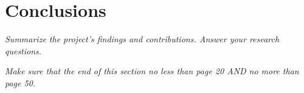 \section{Conclusions}

\textit{Summarize the project's findings and contributions. Answer your research questions.}

\textit{Make sure that the end of this section no less than page 20 AND no more than page 50.}
